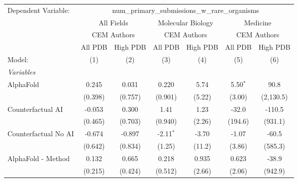 \begingroup
\centering
\begin{tabular}{lcccccc}
   \tabularnewline \midrule \midrule
   Dependent Variable: & \multicolumn{6}{c}{num\_primary\_submissions\_w\_rare\_organisms}\\
 & \multicolumn{2}{c}{All Fields} & \multicolumn{2}{c}{Molecular Biology} & \multicolumn{2}{c}{Medicine} \\
\cmidrule(lr){2-3} \cmidrule(lr){4-5} \cmidrule(lr){6-7}
 & \multicolumn{2}{c}{CEM Authors} & \multicolumn{2}{c}{CEM Authors} & \multicolumn{2}{c}{CEM Authors} \\
\cmidrule(lr){2-3} \cmidrule(lr){4-5} \cmidrule(lr){6-7}
 & \multicolumn{1}{c}{All PDB} & \multicolumn{1}{c}{High PDB} & \multicolumn{1}{c}{All PDB} & \multicolumn{1}{c}{High PDB} & \multicolumn{1}{c}{All PDB} & \multicolumn{1}{c}{High PDB} \\
\cmidrule(lr){2-2} \cmidrule(lr){3-3} \cmidrule(lr){4-4} \cmidrule(lr){5-5} \cmidrule(lr){6-6} \cmidrule(lr){7-7}
   Model:                                                     & (1)        & (2)           & (3)         & (4)    & (5)        & (6)\\  
   \midrule
   \emph{Variables}\\
   AlphaFold                                                  & 0.245      & 0.031         & 0.220       & 5.74   & 5.50$^{*}$ & 90.8\\   
                                                              & (0.398)    & (0.757)       & (0.901)     & (5.22) & (3.00)     & (2,130.5)\\   
   Counterfactual AI                                          & -0.053     & 0.300         & 1.41        & 1.23   & -32.0      & -110.5\\   
                                                              & (0.465)    & (0.703)       & (0.940)     & (2.26) & (194.6)    & (931.1)\\   
   Counterfactual No AI                                       & -0.674     & -0.897        & -2.11$^{*}$ & -3.70  & -1.07      & -60.5\\   
                                                              & (0.642)    & (0.834)       & (1.25)      & (11.2) & (3.86)     & (585.3)\\   
   AlphaFold - Method                                         & 0.132      & 0.665         & 0.218       & 0.935  & 0.623      & -38.9\\   
                                                              & (0.215)    & (0.424)       & (0.512)     & (2.66) & (2.06)     & (942.9)\\   

\end{tabular}
